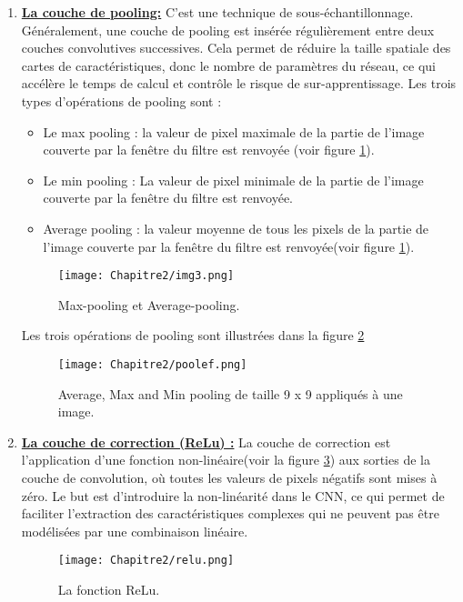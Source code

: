 \begin{enumerate}
\item \underline{\textbf{La couche de pooling:}}
C'est une technique de sous-échantillonnage. Généralement, une couche de pooling est insérée régulièrement entre deux couches convolutives successives.  Cela permet de réduire la taille spatiale des cartes de caractéristiques, donc le nombre de paramètres du réseau, ce qui accélère le temps de calcul et contrôle le risque de sur-apprentissage. 
Les trois types d'opérations de pooling sont :
\begin{itemize}
\item Le max pooling : la valeur de pixel maximale de la partie de l'image couverte par la fenêtre du filtre est renvoyée (voir figure \ref{pool}).
\item Le min pooling : La valeur de pixel minimale  de la partie de l'image couverte par la fenêtre du filtre est renvoyée.
\item Average pooling : la valeur moyenne de tous les pixels  de la partie de l'image couverte par la fenêtre du filtre est renvoyée(voir figure \ref{pool}).
\end{itemize}
 
     \begin{figure}[H]
          \centering
          \texttt{[image: Chapitre2/img3.png]}
          \caption{Max-pooling et Average-pooling.}
          \label{pool}
          \end{figure}

Les trois opérations de pooling sont illustrées dans la figure \ref{poolef}

\begin{figure}[H]
\centering
\texttt{[image: Chapitre2/poolef.png]}
\caption{Average, Max and Min pooling de taille 9 x 9 appliqués à une image.}
\label{poolef}
\end{figure}

\item \underline{\textbf{La couche de correction (ReLu) :}}
La couche de correction est l'application d'une fonction non-linéaire(voir la figure \ref{relu}) aux sorties de la couche de convolution, où toutes les valeurs de pixels négatifs sont mises à zéro. Le but est d'introduire la non-linéarité dans le CNN, ce qui permet de faciliter l'extraction des caractéristiques complexes qui ne peuvent pas être modélisées par une combinaison linéaire.

\begin{figure}[H]
\centering
\texttt{[image: Chapitre2/relu.png]}
\caption{La fonction ReLu.}
\label{relu}
\end{figure}


\end{enumerate}

